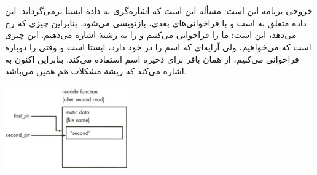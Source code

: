 \section{}
\paragraph{}\label{answer:100}
خروجی برنامه این است:
\LTR\noindent
{}
\RTL
مسأله این است که  اشاره‌گری به دادهٔ ایستا برمی‌گرداند. این داده متعلق به  است و با فراخوانی‌های بعدی، بازنویسی می‌شود. بنابراین چیزی که رخ می‌دهد، این است: ما  را فراخوانی می‌کنیم و  را به رشتهٔ  اشاره می‌دهیم. این چیزی است که می‌خواهیم، ولی آرایه‌ای که اسم را در خود دارد، ایستا است و وقتی  را دوباره فراخوانی می‌کنیم، از همان بافر برای ذخیره اسم  استفاده می‌کند. بنابراین اکنون  به  اشاره می‌کند که ریشهٔ مشکلات هم همین می‌باشد.

\begin{center}
    \includegraphics[keepaspectratio,width=0.4\textwidth,height=0.4\textheight]{images/image03.jpg}
\end{center}